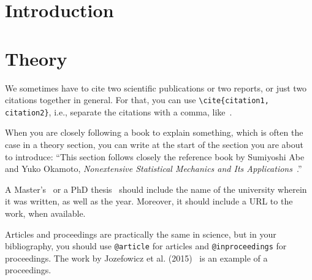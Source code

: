 \documentclass[masters,en,listoffigures,listoftables]{NMBU}
\title{}
\author{}
\begin{document}


\startthesis %


\section{Introduction}

\clearpage %
\section{Theory}

We sometimes have to cite two scientific publications or two reports, or just two citations together in general. For that, you can use \verb|\cite{citation1, citation2}|, i.e., separate the citations with a comma, like~\parencite{Beck2000application, Beck2005timeseries, Milano2018}.

When you are closely following a book to explain something, which is often the case in a theory section, you can write at the start of the section you are about to introduce: ``This section follows closely the reference book by Sumiyoshi Abe and Yuko Okamoto, \emph{Nonextensive Statistical Mechanics and Its Applications}~\parencite[p.~32]{Abe2001nonextensive}.''

A Master's~\cite{LastName2045norwegian} or a PhD thesis~\cite{Temult2038binding} should include the name of the university wherein it was written, as well as the year. Moreover, it should include a URL to the work, when available.

Articles and proceedings are practically the same in science, but in your bibliography, you should use \verb|@article| for articles and \verb|@inproceedings| for proceedings. The work by Jozefowicz et al. (2015)~\cite{Jozefowicz2015empirical} is an example of a proceedings.
\end{document}
